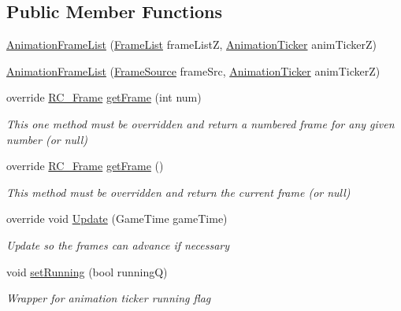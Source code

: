 \subsection*{Public Member Functions}
\begin{DoxyCompactItemize}
\item 
\mbox{\hyperlink{class_r_c___framework_1_1_animation_frame_list_ad4853f5ccf776a762d4a3ca431cf623f}{Animation\+Frame\+List}} (\mbox{\hyperlink{class_r_c___framework_1_1_frame_list}{Frame\+List}} frame\+ListZ, \mbox{\hyperlink{class_r_c___framework_1_1_animation_ticker}{Animation\+Ticker}} anim\+TickerZ)
\item 
\mbox{\hyperlink{class_r_c___framework_1_1_animation_frame_list_aa04cc11efd6dbb3cb04b4e67f63fc670}{Animation\+Frame\+List}} (\mbox{\hyperlink{class_r_c___framework_1_1_frame_source}{Frame\+Source}} frame\+Src, \mbox{\hyperlink{class_r_c___framework_1_1_animation_ticker}{Animation\+Ticker}} anim\+TickerZ)
\item 
override \mbox{\hyperlink{class_r_c___framework_1_1_r_c___frame}{R\+C\+\_\+\+Frame}} \mbox{\hyperlink{class_r_c___framework_1_1_animation_frame_list_aa253565464d98bf955c81702fd3d66a4}{get\+Frame}} (int num)
\begin{DoxyCompactList}\small\item\em This one method must be overridden and return a numbered frame for any given number (or null) \end{DoxyCompactList}\item 
override \mbox{\hyperlink{class_r_c___framework_1_1_r_c___frame}{R\+C\+\_\+\+Frame}} \mbox{\hyperlink{class_r_c___framework_1_1_animation_frame_list_a5bc162ddb15e2ef4f98b72be2720a87b}{get\+Frame}} ()
\begin{DoxyCompactList}\small\item\em This method must be overridden and return the current frame (or null) \end{DoxyCompactList}\item 
override void \mbox{\hyperlink{class_r_c___framework_1_1_animation_frame_list_ad6d3b045da01a972a32f48ae7b7c7598}{Update}} (Game\+Time game\+Time)
\begin{DoxyCompactList}\small\item\em Update so the frames can advance if necessary \end{DoxyCompactList}\item 
void \mbox{\hyperlink{class_r_c___framework_1_1_animation_frame_list_af45c9ca8028ef05f2a23def6bf4f5f82}{set\+Running}} (bool runningQ)
\begin{DoxyCompactList}\small\item\em Wrapper for animation ticker running flag \end{DoxyCompactList}\end{DoxyCompactItemize}
